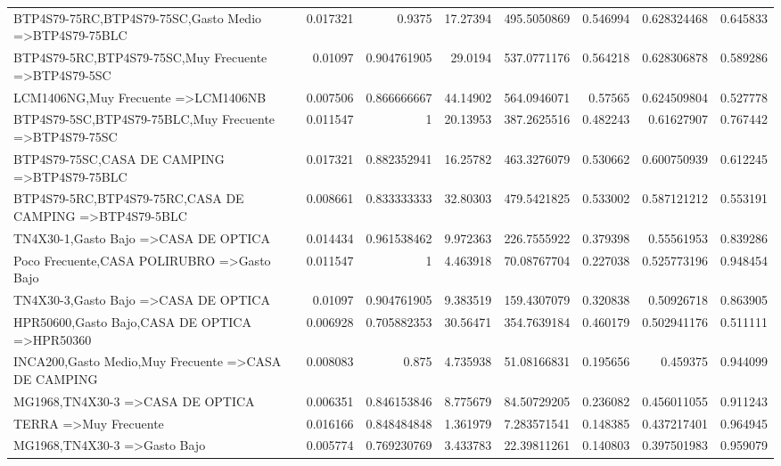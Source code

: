 \documentclass[]{article}
\begin{document}
\begin{landscape}
\begin{table}[htbp]
\begin{tabular}{lrrrrrrr}
			{BTP4S79-75RC,BTP4S79-75SC,Gasto Medio} =\textgreater {BTP4S79-75BLC} & 0.017321 & 0.9375 & 17.27394 & 495.5050869 & 0.546994 & 0.628324468 & 0.645833 \\
			{BTP4S79-5RC,BTP4S79-75SC,Muy Frecuente} =\textgreater {BTP4S79-5SC} & 0.01097 & 0.904761905 & 29.0194 & 537.0771176 & 0.564218 & 0.628306878 & 0.589286 \\
			{LCM1406NG,Muy Frecuente} =\textgreater {LCM1406NB} & 0.007506 & 0.866666667 & 44.14902 & 564.0946071 & 0.57565 & 0.624509804 & 0.527778 \\
			{BTP4S79-5SC,BTP4S79-75BLC,Muy Frecuente} =\textgreater {BTP4S79-75SC} & 0.011547 & 1     & 20.13953 & 387.2625516 & 0.482243 & 0.61627907 & 0.767442 \\
			{BTP4S79-75SC,CASA DE CAMPING} =\textgreater {BTP4S79-75BLC} & 0.017321 & 0.882352941 & 16.25782 & 463.3276079 & 0.530662 & 0.600750939 & 0.612245 \\
			{BTP4S79-5RC,BTP4S79-75RC,CASA DE CAMPING} =\textgreater {BTP4S79-5BLC} & 0.008661 & 0.833333333 & 32.80303 & 479.5421825 & 0.533002 & 0.587121212 & 0.553191 \\
			{TN4X30-1,Gasto Bajo} =\textgreater {CASA DE OPTICA} & 0.014434 & 0.961538462 & 9.972363 & 226.7555922 & 0.379398 & 0.55561953 & 0.839286 \\
			{Poco Frecuente,CASA POLIRUBRO} =\textgreater {Gasto Bajo} & 0.011547 & 1     & 4.463918 & 70.08767704 & 0.227038 & 0.525773196 & 0.948454 \\
			{TN4X30-3,Gasto Bajo} =\textgreater {CASA DE OPTICA} & 0.01097 & 0.904761905 & 9.383519 & 159.4307079 & 0.320838 & 0.50926718 & 0.863905 \\
			{HPR50600,Gasto Bajo,CASA DE OPTICA} =\textgreater {HPR50360} & 0.006928 & 0.705882353 & 30.56471 & 354.7639184 & 0.460179 & 0.502941176 & 0.511111 \\
			{INCA200,Gasto Medio,Muy Frecuente} =\textgreater {CASA DE CAMPING} & 0.008083 & 0.875 & 4.735938 & 51.08166831 & 0.195656 & 0.459375 & 0.944099 \\
			{MG1968,TN4X30-3} =\textgreater {CASA DE OPTICA} & 0.006351 & 0.846153846 & 8.775679 & 84.50729205 & 0.236082 & 0.456011055 & 0.911243 \\
			{TERRA} =\textgreater {Muy Frecuente} & 0.016166 & 0.848484848 & 1.361979 & 7.283571541 & 0.148385 & 0.437217401 & 0.964945 \\
			{MG1968,TN4X30-3} =\textgreater {Gasto Bajo} & 0.005774 & 0.769230769 & 3.433783 & 22.39811261 & 0.140803 & 0.397501983 & 0.959079 \\

\end{tabular}
\end{table}
\end{landscape}
\end{document}
